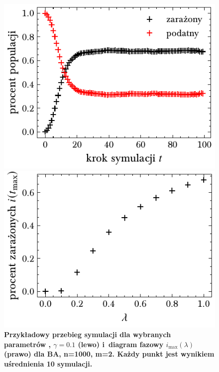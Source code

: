 \documentclass[13pt,a4paper]{article}
\begin{document}
\begin{figure}[ht!]
	\centering
	\begin{minipage}[t]{0.49\textwidth}
		\centering
		\includegraphics[width=\textwidth]{../figures/none/ba_infected_vs_step.pdf}
	\end{minipage}
	\begin{minipage}[t]{0.49\textwidth}
		\centering
		\includegraphics[width=\textwidth]{../figures/none/ba_infected_vs_ratio.pdf}
	\end{minipage}
	\caption{\centering\textbf{Przykładowy przebieg symulacji dla wybranych parametrów , $\gamma=0.1$ (lewo) i diagram fazowy $i_{\max}(\lambda)$ (prawo) dla BA, n=1000, m=2. Każdy punkt jest wynikiem uśrednienia 10 symulacji.}}
\end{figure}
\end{document}
